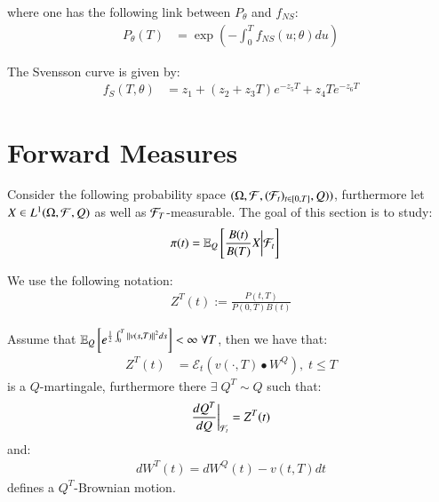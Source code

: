 where one has the following link between $P_{\theta}$ and $f_{NS}$: 
\begin{align*}
P_{\theta}(T) &= \exp\left(
-\int_{0}^{T}f_{NS}(u;\theta)du
\right)    
\end{align*}

The Svensson curve is given by: 
\begin{align*}
f_{S}(T, \theta) &= 
z_{1} + (z_{2}+z_{3}T)e^{-z_{5}T} + z_{4}Te^{-z_{6}T}
\end{align*}






\newpage 
\section{Forward Measures}
Consider the following probability space $(\Omega, \mathcal{F}, (\mathcal{F}_{t})_{t \in [0,T]}, Q))$, furthermore let \\ 
$X\in L^{1}(\Omega, \mathcal{F}, Q)$ as well as $\mathcal{F}_{T}$-measurable. The goal of this section is to study: 
\begin{align*}
\pi(t) &= \mathbb{E}_{Q}\left[
\frac{B(t)}{B(T)}X\bigg{|}\mathcal{F}_{t}
\right]    
\end{align*}

\begin{notation}
We use the following notation: 
\begin{align*}
Z^{T}(t) := \frac{P(t,T)}{P(0,T)B(t)}    
\end{align*}
\end{notation}


\begin{proposition}
\label{prop: Z(T)(t)_Q_martingale}
Assume that $\mathbb{E}_{Q}\left[e^{\frac{1}{2}\int_{0}^{T}\norm{v(s,T)}^{2}ds}\right] < \infty \; \forall T$, then we have that: 
\begin{align*}
Z^{T}(t) 
&= \mathcal{E}_{t}(v(\cdot, T)\bullet W^{Q}), \; t\leq T
\end{align*}
is a $Q$-martingale, furthermore there $\exists\; Q^{T}\sim Q$ such that:
\begin{align*}
\frac{dQ^{T}}{dQ}\bigg{|}_{\mathcal{F}_{t}} = Z^{T}(t)    
\end{align*}
and: 
\begin{align*}
dW^{T}(t) = dW^{Q}(t) - v(t,T)dt    
\end{align*}
defines a $Q^{T}$-Brownian motion. 
\end{proposition}

